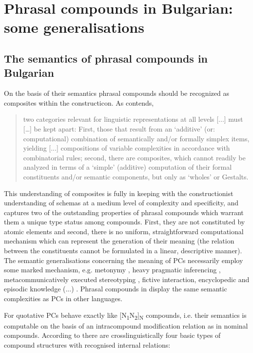 \documentclass[output=paper]{LSP/langsci}
\begin{document}
\section{Phrasal compounds in Bulgarian: some generalisations}\label{sec:bagasheva:5}



\subsection{The semantics of phrasal compounds in Bulgarian}\label{sec:bagasheva:5.1}



On the basis of their semantics phrasal compounds should be recognized as composites within the constructicon. As \citet[62-63]{Lampert2009} contends,


\begin{quotation}
two categories relevant for linguistic representations at all levels [...] must […] be kept apart: First, those that result from an ‘additive’ (or: computational) combination of semantically and/or formally simplex items, yielding [...] compositions of variable complexities in accordance with combinatorial rules; second, there are composites, which cannot readily be analyzed in terms of a ‘simple’ (additive) computation of their formal constituents and/or semantic components, but only as ‘wholes’ or Gestalts.
\end{quotation} 

This understanding of composites is fully in keeping with the constructionist understanding of schemas at a medium level of complexity and specificity, and captures two of the outstanding properties of phrasal compounds which warrant them a unique type status among compounds. First, they are not constituted by atomic elements and second, there is no uniform, straightforward computational mechanism which can represent the generation of their meaning (the relation between the constituents cannot be formulated in a linear, descriptive manner). The semantic generalisations concerning the meaning of PCs necessarily employ some marked mechanism, e.g. metonymy \citep{Trips2016}, heavy pragmatic inferencing \citep{Meibauer2015}, metacommunicatively executed stereotyping \citep{Hohenhaus2007}, fictive interaction, encyclopedic and episodic knowledge (...) \citep{Pascual2013}. Phrasal compounds in  display the same semantic complexities as PCs in other languages. 


For \citet{Pafel2015} quotative PCs behave exactly like [N\textsubscript{1}N\textsubscript{2}]\textsubscript{N} compounds, i.e. their semantics is computable on the basis of an intracompound modification relation as in  nominal compounds. According to \citet[145]{HeineKuteva2009} there are crosslinguistically four basic types of compound structures with recognised internal relations: 
\end{document}
